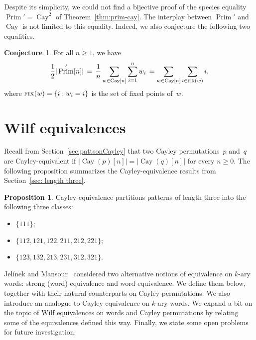 \documentclass[a4paper, 11pt]{article}
\DeclareMathOperator{\Cay}{Cay}
\DeclareMathOperator{\Prim}{Prim}
\theoremstyle{definition}
\newtheorem{conjecture}[theorem]{Conjecture}
\newtheorem{proposition}[theorem]{Proposition}
\begin{document}
Despite its simplicity, we could not find a bijective proof of the
species equality $\Prim'=\Cay^2$ of Theorem~\ref{thm:prim-cay}.
The interplay between $\Prim'$ and $\Cay$ is not limited to this
equality. Indeed, we also conjecture the following two equalities.

\begin{conjecture}
For all $n\geq 1$, we have
$$
\frac{1}{2}|\Prim'[n]|
\,=\, \frac{1}{n} \sum_{w\in\Cay[n]}\sum_{i=1}^n w_i
\,= \sum_{w\in\Cay[n]} \sum_{i\in\textsc{fix}(w)}i,
$$
where $\textsc{fix}(w)=\{ i: w_i=i\}$ is the set of fixed points of~$w$.
\end{conjecture}

\section{Wilf equivalences}\label{section: wilfeq}

Recall from Section~\ref{sec:pattsonCayley} that two Cayley
permutations~$p$ and~$q$ are Cayley-equivalent if
$|\Cay(p)[n]|=|\Cay(q)[n]|$ for every $n\ge 0$. The following proposition 
summarizes the Cayley-equivalence results from Section~\ref{sec: length three}.

\begin{proposition}
Cayley-equivalence partitions patterns of length three into the following three classes:
\begin{itemize}
\item $\{111\}$;
\item $\{112,121,122,211,212,221\}$;
\item $\{123,132,213,231,312,321\}$.
\end{itemize}
\end{proposition}

Jel\'inek and Mansour~\cite{k-ary} considered two alternative notions
of equivalence on $k$-ary words: strong (word) equivalence and word
equivalence. We define them below, together with their natural
counterparts on Cayley permutations. We also introduce an analogue
to Cayley-equivalence on $k$-ary words. We expand a bit on the
topic of Wilf equivalences on words and Cayley permutations by relating
some of the equivalences defined this way. Finally, we state some
open problems for future investigation.
\end{document}
